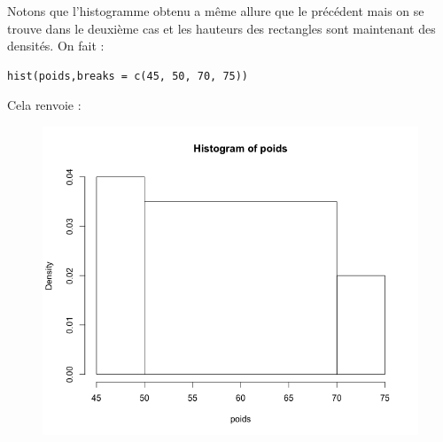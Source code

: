 Notons que l'histogramme obtenu a même allure que le précédent mais on se trouve dans le deuxième cas et les hauteurs des rectangles sont maintenant des densités.\newline
On fait :
\begin{lstlisting}[language=html]
hist(poids,breaks = c(45, 50, 70, 75))
\end{lstlisting}
Cela renvoie :
\begin{figure}[H]\begin{center}\includegraphics[scale=0.4]{ilu/gra47.png}\end{center}\end{figure}

